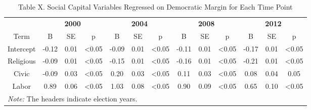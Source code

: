 \documentclass[
  english,
  man]{apa6}
\begin{document}
\begin{table}

\caption{\label{tab:regression}Table X. Social Capital Variables Regressed on Democratic Margin for Each Time Point}
\centering
\begin{tabular}[t]{c|c|c|c|c|c|c|c|c|c|c|c|c}
\hline
\multicolumn{1}{c|}{\textbf{ }} & \multicolumn{3}{c|}{\textbf{2000}} & \multicolumn{3}{c|}{\textbf{2004}} & \multicolumn{3}{c|}{\textbf{2008}} & \multicolumn{3}{c}{\textbf{2012}} \\
\cline{2-4} \cline{5-7} \cline{8-10} \cline{11-13}
Term & B & SE & p & B & SE & p & B & SE & p & B & SE & p\\
\hline
Intercept & -0.12 & 0.01 & <0.05 & -0.09 & 0.01 & <0.05 & -0.11 & 0.01 & <0.05 & -0.17 & 0.01 & <0.05\\
\hline
Religious & -0.09 & 0.01 & <0.05 & -0.15 & 0.01 & <0.05 & -0.16 & 0.01 & <0.05 & -0.21 & 0.01 & <0.05\\
\hline
Civic & -0.09 & 0.03 & <0.05 & 0.20 & 0.03 & <0.05 & 0.11 & 0.03 & <0.05 & 0.08 & 0.04 & 0.05\\
\hline
Labor & 0.89 & 0.06 & <0.05 & 1.03 & 0.08 & <0.05 & 0.90 & 0.09 & <0.05 & 0.65 & 0.10 & <0.05\\
\hline
\multicolumn{13}{l}{\rule{0pt}{1em}\textit{Note: } The headers indicate election years.}\\
\end{tabular}
\end{table}
\end{document}
